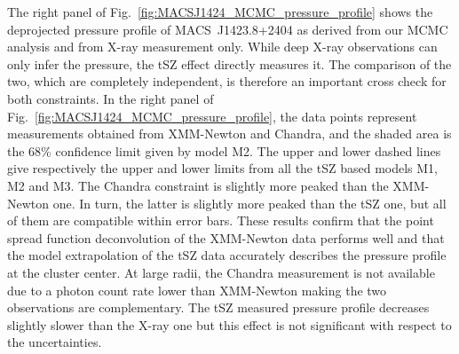 \documentclass[twocolumn,traditabstract]{aa}
\begin{document}
The right panel of Fig.~\ref{fig:MACSJ1424_MCMC_pressure_profile} shows the deprojected pressure profile of \mbox{MACS~J1423.8+2404} as derived from our MCMC analysis and from X-ray measurement only. While deep X-ray observations can only infer the pressure, the tSZ effect directly measures it. The comparison of the two, which are completely independent, is therefore an important cross check for both constraints. In the right panel of Fig.~\ref{fig:MACSJ1424_MCMC_pressure_profile}, the data points represent measurements obtained from XMM-Newton and Chandra, and the shaded area is the 68\% confidence limit given by model M2. The upper and lower dashed lines give respectively the upper and lower limits from all the tSZ based models M1, M2 and M3. The Chandra constraint is slightly more peaked than the XMM-Newton one. In turn, the latter is slightly more peaked than the tSZ one, but all of them are compatible within error bars. These results confirm that the point spread function deconvolution of the XMM-Newton data performs well and that the model extrapolation of the tSZ data accurately describes the pressure profile at the cluster center. At large radii, the Chandra measurement is not available due to a photon count rate lower than XMM-Newton making the two observations are complementary. The tSZ measured pressure profile decreases slightly slower than the X-ray one but this effect is not significant with respect to the uncertainties.
\end{document}
